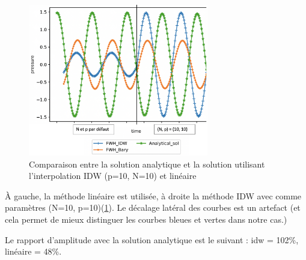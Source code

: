 \begin{figure}[H]
    \centering
    \includegraphics[width=0.70\textwidth]{images/rapport_a_np.png}
    \caption{Comparaison entre la solution analytique et la solution utilisant l'interpolation IDW (p=10, N=10) et linéaire}
    \label{fig:np10}
\end{figure}

À gauche, la méthode linéaire est utilisée, à droite la méthode IDW avec comme paramètres (N=10, p=10)(\ref{fig:np10}). Le décalage latéral des courbes est un artefact (et cela permet de mieux distinguer les courbes bleues et vertes dans notre cas.)

Le rapport d'amplitude avec la solution analytique est le suivant : idw = 102\%, linéaire = 48\%. %






